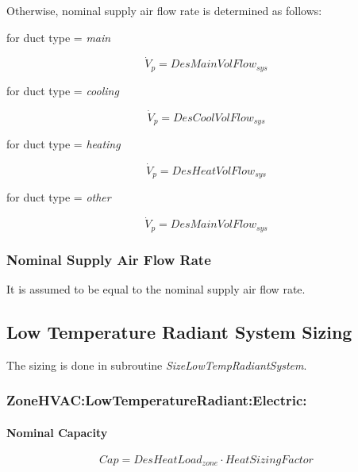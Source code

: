 Otherwise, nominal supply air flow rate is determined as follows:

for duct type = \emph{main}

\begin{equation}
{\dot V_p} = DesMainVolFlo{w_{sys}}
\end{equation}

for duct type = \emph{cooling}

\begin{equation}
{\dot V_p} = DesCoolVolFlo{w_{sys}}
\end{equation}

for duct type = \emph{heating}

\begin{equation}
{\dot V_p} = DesHeatVolFlo{w_{sys}}
\end{equation}

for duct type = \emph{other}

\begin{equation}
{\dot V_p} = DesMainVolFlo{w_{sys}}
\end{equation}

\subsubsection{Nominal Supply Air Flow Rate}\label{nominal-supply-air-flow-rate-1}

It is assumed to be equal to the nominal supply air flow rate.

\subsection{Low Temperature Radiant System Sizing}\label{low-temperature-radiant-system-sizing}

The sizing is done in subroutine \emph{SizeLowTempRadiantSystem}.

\subsubsection{ZoneHVAC:LowTemperatureRadiant:Electric:}\label{zonehvaclowtemperatureradiantelectric}

\paragraph{Nominal Capacity}\label{nominal-capacity-1}

\begin{equation}
Cap = DesHeatLoa{d_{zone}} \cdot HeatSizingFactor
\end{equation}

